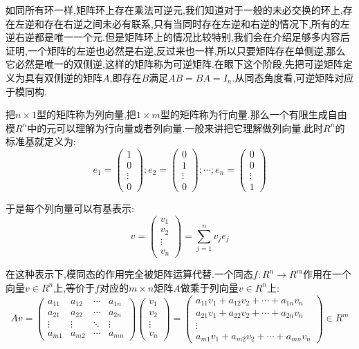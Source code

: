 如同所有环一样,矩阵环上存在乘法可逆元,我们知道对于一般的未必交换的环上,存在左逆和存在右逆之间未必有联系,只有当同时存在左逆和右逆的情况下,所有的左逆右逆都是唯一一个元.但是矩阵环上的情况比较特别,我们会在介绍足够多内容后证明,一个矩阵的左逆也必然是右逆,反过来也一样,所以只要矩阵存在单侧逆,那么它必然是唯一的双侧逆,这样的矩阵称为可逆矩阵.在眼下这个阶段,先把可逆矩阵定义为具有双侧逆的矩阵$A$,即存在$B$满足$AB=BA=I_n$.从同态角度看,可逆矩阵对应于模同构.

把$n\times 1$型的矩阵称为列向量,把$1\times m$型的矩阵称为行向量.那么一个有限生成自由模$R^n$中的元可以理解为行向量或者列向量.一般来讲把它理解做列向量.此时$R^n$的标准基就定义为:
$$e_1=\left(\begin{array}{c}
1\\
0\\
\vdots\\
0\end{array}\right);e_2=\left(\begin{array}{c}
0\\
1\\
\vdots\\
0\end{array}\right);\cdots;e_n=\left(\begin{array}{c}
0\\
0\\
\vdots\\
1\end{array}\right)$$

于是每个列向量可以有基表示:
$$v=\left(\begin{array}{c}
v_1\\
v_2\\
\vdots\\
v_n\end{array}\right)=\sum_{j=1}^nv_je_j$$

在这种表示下,模同态的作用完全被矩阵运算代替.一个同态$f:R^n\to R^m$作用在一个向量$v\in R^n$上,等价于$f$对应的$m\times n$矩阵$A$做乘于列向量$v\in R^n$上:
$$Av=\left(\begin{array}{cccc}
a_{11}&a_{12}&\cdots&a_{1n}\\
a_{21}&a_{22}&\cdots&a_{2n}\\
\vdots&\vdots&\ddots&\vdots\\
a_{m1}&a_{m2}&\cdots&a_{mn}
\end{array}\right)\left(\begin{array}{c}
v_1\\
v_2\\
\vdots\\
v_n\end{array}\right)=\left(\begin{array}{c}
a_{11}v_1+a_{12}v_2+\cdots+a_{1n}v_n\\
a_{21}v_1+a_{22}v_2+\cdots+a_{2n}v_n\\
\vdots\\
a_{m1}v_1+a_{m2}v_2+\cdots+a_{mn}v_n\end{array}\right)\in R^m$$

